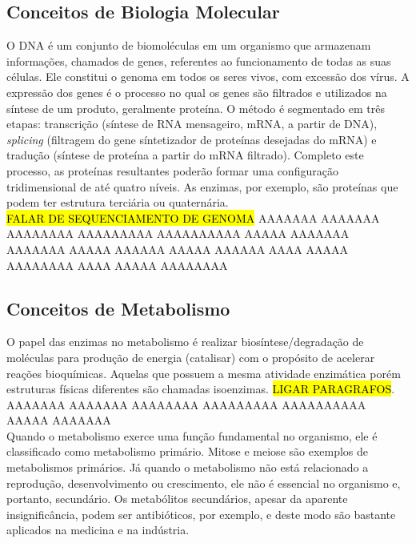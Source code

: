 \documentclass[conference]{IEEEtran}
\begin{document}
\subsection{Conceitos de Biologia Molecular}

O DNA é um conjunto de biomoléculas em um organismo que armazenam informações, chamados de genes, referentes ao funcionamento de todas as suas células. Ele constitui o genoma em todos os seres vivos, com excessão dos vírus. A expressão dos genes é o processo no qual os genes são filtrados e utilizados na síntese de um produto, geralmente proteína. O método é segmentado em três etapas: transcrição (síntese de RNA mensageiro, mRNA, a partir de DNA), \textit{splicing} (filtragem do gene síntetizador de proteínas desejadas do mRNA) e tradução (síntese de proteína a partir do mRNA filtrado). Completo este processo, as proteínas resultantes poderão formar uma configuração tridimensional de até quatro níveis. As enzimas, por exemplo, são proteínas que podem ter estrutura terciária ou quaternária. \\
\indent \hl{FALAR DE SEQUENCIAMENTO DE GENOMA} \indent AAAAAAA AAAAAAA  AAAAAAAA AAAAAAAAA AAAAAAAAAA AAAAA AAAAAAA AAAAAAA AAAAA AAAAAA AAAAA AAAAAA AAAA AAAAA AAAAAAAA AAAA AAAAA AAAAAAAA \\

\subsection{Conceitos de Metabolismo}

O papel das enzimas no metabolismo é realizar biosíntese/degradação de moléculas para produção de energia (catalisar) com o propósito de acelerar reações bioquímicas. Aquelas que possuem a mesma atividade enzimática porém estruturas físicas diferentes são chamadas isoenzimas. \hl{LIGAR PARAGRAFOS}. \indent AAAAAAA AAAAAAA  AAAAAAAA AAAAAAAAA AAAAAAAAAA AAAAA AAAAAAA \\
\indent Quando o metabolismo exerce uma função fundamental no organismo, ele é classificado como metabolismo primário. Mitose e meiose são exemplos de metabolismos primários. Já quando o metabolismo não está relacionado a reprodução, desenvolvimento ou crescimento, ele não é essencial no organismo e, portanto, secundário. Os metabólitos secundários, apesar da aparente insignificância, podem ser antibióticos, por exemplo, e deste modo são bastante aplicados na medicina e na indústria.

\end{document}
